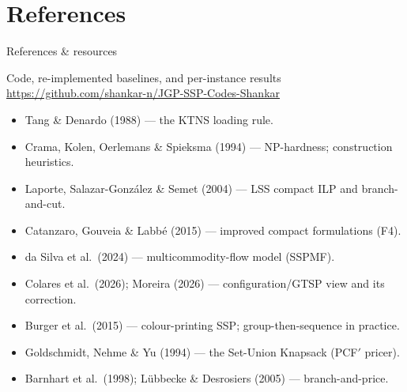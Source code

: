 \documentclass[10pt]{beamer}
\begin{document}
\section*{References}
\begin{frame}{References \& resources}
\begin{block}{Code, re-implemented baselines, and per-instance results}
\centering\small\url{https://github.com/shankar-n/JGP-SSP-Codes-Shankar}
\end{block}
\footnotesize
\begin{itemize}\itemsep2pt
  \item Tang \& Denardo (1988) --- the KTNS loading rule.
  \item Crama, Kolen, Oerlemans \& Spieksma (1994) --- NP-hardness; construction heuristics.
  \item Laporte, Salazar-Gonz\'alez \& Semet (2004) --- LSS compact ILP and branch-and-cut.
  \item Catanzaro, Gouveia \& Labb\'e (2015) --- improved compact formulations (F4).
  \item da Silva et al.\ (2024) --- multicommodity-flow model (SSPMF).
  \item Colares et al.\ (2026); Moreira (2026) --- configuration/GTSP view and its correction.
  \item Burger et al.\ (2015) --- colour-printing SSP; group-then-sequence in practice.
  \item Goldschmidt, Nehme \& Yu (1994) --- the Set-Union Knapsack (PCF$'$ pricer).
  \item Barnhart et al.\ (1998); L\"ubbecke \& Desrosiers (2005) --- branch-and-price.
\end{itemize}
\end{frame}
\end{document}
